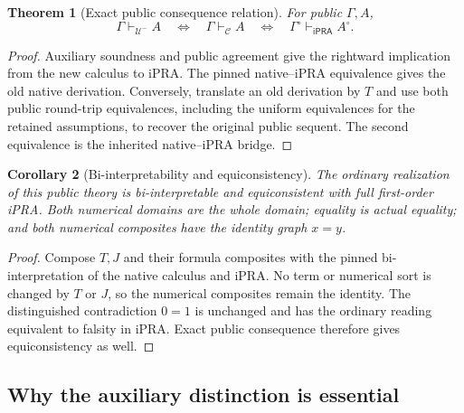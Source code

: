 \documentclass[11pt,letterpaper]{article}
\newtheorem{theorem}{Theorem}[section]
\newtheorem{corollary}[theorem]{Corollary}
\theoremstyle{definition}\newtheorem{definition}[theorem]{Definition}
\theoremstyle{remark}\newtheorem{remark}[theorem]{Remark}
\newcommand{\ipra}{\mathsf{iPRA}}
\newcommand{\U}{\mathcal U^{-}}
\begin{document}
\begin{theorem}[Exact public consequence relation]\label{thm:exact-public}
For public $\Gamma,A$,
\[
 \Gamma\vdash_{\U}A
 \quad\Longleftrightarrow\quad
 \Gamma\vdash_{\mathcal C}A
 \quad\Longleftrightarrow\quad
 \Gamma^\circ\vdash_{\ipra}A^\circ.
\]
\end{theorem}
\begin{proof}
Auxiliary soundness and public agreement give the rightward implication
from the new calculus to iPRA.  The pinned native--iPRA equivalence gives
the old native derivation.  Conversely, translate an old derivation by
$T$ and use both public round-trip equivalences, including the uniform
equivalences for the retained assumptions, to recover the original public
sequent.  The second equivalence is the inherited native--iPRA bridge.
\end{proof}

\begin{corollary}[Bi-interpretability and equiconsistency]
The ordinary realization of this public theory is bi-interpretable and
equiconsistent with full first-order iPRA.  Both numerical domains are the
whole domain; equality is actual equality; and both numerical composites
have the identity graph $x=y$.
\end{corollary}
\begin{proof}
Compose $T,J$ and their formula composites with the pinned
bi-interpretation of the native calculus and iPRA.  No term or numerical
sort is changed by $T$ or $J$, so the numerical composites remain the
identity.  The distinguished contradiction $0=1$ is unchanged and has
the ordinary reading equivalent to falsity in iPRA.  Exact public
consequence therefore gives equiconsistency as well.
\end{proof}

\subsection{Why the auxiliary distinction is essential}
\end{document}
